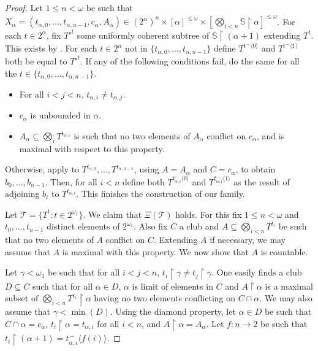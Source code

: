 \documentclass[a4paper,noamsfonts]{amsart}
\theoremstyle{definition}
\newcommand{\seb}{\subseteq}
\newcommand{\res}{\!\upharpoonright\!}
\newcommand{\tup}[1]{\langle#1\rangle}
\newcommand{\1}{\mathbbm{1}}
\newcommand{\T}{\mathcal{T}}
\newcommand{\prop}{\Xi}
\renewcommand{\S}{\mathbb{S}}
\begin{document}
\begin{proof}
  Let $1 \le n < \omega$ be such that $X_{\alpha} =
  (t_{\alpha,0},\dots,t_{\alpha,n-1},c_{\alpha},A_{\alpha}) \in
  (2^{\alpha})^{n}\times [\alpha]^{\le\omega}\times
    [\bigotimes_{i <n} \S\res \alpha]^{\le\omega}$.
  For each $t \in 2^{\alpha}$, fix  ${T'}^{t}$
  some uniformly coherent
  subtree of $\S \res (\alpha+1)$ extending $T^{t}$. This exists
  by . For each $t \in 2^{\alpha}$ not in
  $\{t_{\alpha,0},\dots,t_{\alpha,n-1}\}$ define
  $T^{t^{\frown}\tup{0}}$ and $T^{t^{\frown}\tup{1}}$ both be equal
  to ${T'}^{t}$.  
  If any of the following conditions fail, do the
  same for all the $t \in \{t_{\alpha,0},\dots,t_{\alpha,n-1}\}$.
  \begin{itemize}
    \item For all $i < j < n$, $t_{\alpha,i} \neq t_{\alpha,j}$.
    \item $c_{\alpha}$ is unbounded in $\alpha$.
    \item $A_{\alpha} \seb \bigotimes_{i}T^{t_{\alpha,i}}$ is such that
    no two elements of $A_{\alpha}$ conflict on $c_{\alpha}$, and is maximal
    with respect to this property.
  \end{itemize}
  Otherwise, apply 
  to $T^{t_{\alpha,0}},\dots,T^{t_{\alpha,n-1}}$, using $A = A_{\alpha}$
  and $C = c_{\alpha}$,
  to obtain $b_{0},\dots,
  b_{n-1}$. Then, for all $i < n$ define
  both $T^{t_{\alpha,i}^{\frown}\tup{0}}$ and
  $T^{t_{\alpha,i}^{\frown}\tup{1}}$ as the result of adjoining
  $b_{i}$ to $T^{t_{\alpha,i}}$. This finishes the construction
  of our family.

  Let $\T = \{T^{t} : t \in 2^{\omega_{1}}\}$. We claim
  that $\prop(\T)$ holds. For this fix $1 \le n < \omega$
  and $t_{0},\dots,t_{n-1}$ distinct elements of $2^{\omega_{1}}$.
  Also fix $C$ a club and $A \seb \bigotimes_{i < n}T^{t_{i}}$
  be such that no two elements of $A$ conflict on $C$.
  Extending $A$ if necessary, we may assume that $A$ is maximal
  with this property. We now show that $A$ is countable.

  Let $\gamma < \omega_{1}$ be such that for all $i < j < n$,
  $t_{i}\res \gamma \neq t_{j}\res \gamma$. One easily finds
  a club $D \seb C$ such that for all $\alpha \in D$,
  $\alpha$ is limit of elements in $C$ and $A \res \alpha$ is a maximal
  subset of $\bigotimes_{i < n}T^{t_{i}}\res \alpha$ having
  no two elements conflicting on $C \cap \alpha$. We may
  also assume that $\gamma < \min(D)$. Using the
  diamond property, let $\alpha \in D$ be such that
  $C \cap \alpha = c_{\alpha}$, $t_{i}\res \alpha = t_{\alpha,i}$
  for all $i < n$, and $A \res \alpha = A_{\alpha}$. Let
  $f : n \to 2$ be such that $t_{i}\res(\alpha+1) = t_{\alpha,i}^{\frown}
  \tup{f(i)}$.


\end{proof}
\end{document}
